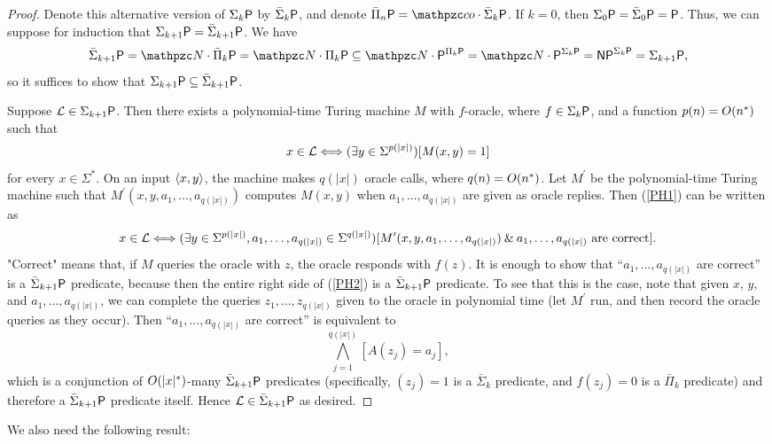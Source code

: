 \begin{proof}
Denote this alternative version of $\Sigma_k\mathsf{P}$ by $\bar\Sigma_k\mathsf{P}$, and 
denote $\bar\Pi_n\sP=\cco\cdot\bar\Sigma_k\sP$. If $k=0$, then 
$\Sigma_0\mathsf{P}=\bar\Sigma_0\mathsf{P}=\mathsf{P}$. Thus, we can suppose for induction that 
$\Sigma_{k+1}\mathsf{P}=\bar\Sigma_{k+1}\mathsf{P}$. We have
\[
\bar\Sigma_{k+1}\sP=\cN\cdot\bar\Pi_k\sP=\cN\cdot\Pi_k\sP\subseteq
\cN\cdot\sP^{\Pi_k\sP}=\cN\cdot\sP^{\Sigma_k\sP}=\NP^{\Sigma_k\sP}=
\Sigma_{k+1}\sP,
\]
so it suffices to show that $\Sigma_{k+1}\mathsf{P}\subseteq\bar\Sigma_{k+1}\mathsf{P}$.

Suppose $\mathcal{L}\in\Sigma_{k+1}\mathsf{P}$. Then there exists a polynomial-time Turing 
machine $M$ with $f$-oracle, where $f\in\Sigma_k\mathsf{P}$, and a function 
$p(n)=O(n^*)$ such that
\begin{equation}\label{PH1}
x\in\mathcal{L}\Longleftrightarrow
(\exists y\in\Sigma^{p(|x|)})[M(x,y)=1]
\end{equation}
for every $x\in\Sigma^*$. On an input $\left\langle x,y\right\rangle$, the machine makes $q(|x|)$ 
oracle calls, where $q(n)=O(n^*)$. Let $M^\prime$ be the polynomial-time Turing 
machine such that $M^\prime(x,y,a_1,\ldots,a_{q(|x|)})$ computes $M(x,y)$ when 
$a_1,\ldots,a_{q(|x|)}$ are given as oracle replies. Then (\ref{PH1}) can be 
written as 
\begin{equation}
x\in\mathcal{L}\Longleftrightarrow
(\exists y\in\Sigma^{p(|x|)},a_1,\ldots,a_{q(|x|)}\in\Sigma^{q(|x|)})
[M^\prime(x,y,a_1,\ldots,a_{q(|x|)})\mathbin{\&} a_1,\ldots,a_{q(|x|)}\text{ are 
correct}].
\end{equation}\label{PH2}
"Correct" means that, if $M$ queries the oracle with $z$, the oracle responds 
with $f(z)$. It is enough to show that ``$a_1,\ldots,a_{q(|x|)}$ are correct'' 
is a $\bar\Sigma_{k+1}\mathsf{P}$ predicate, because then the entire right side of 
(\ref{PH2}) is a $\bar\Sigma_{k+1}\mathsf{P}$ predicate. To see that this is the case, 
note that given $x$, $y$, and $a_1,\ldots,a_{q(|x|)}$, we can complete the 
queries $z_1,\ldots,z_{q(|x|)}$ given to the oracle in polynomial time (let 
$M^\prime$ run, and then record the oracle queries as they occur). Then 
``$a_1,\ldots,a_{q(|x|)}$ are correct'' is equivalent to
\[
\bigwedge_{j=1}^{q(|x|)}[A(z_j)=a_j],
\]
which is a conjunction of $O(|x|^*)$-many $\bar\Sigma_{k+1}\mathsf{P}$ predicates 
(specifically, $(z_j)=1$ is a $\bar\Sigma_k$ predicate, and $f(z_j)=0$ is a 
$\bar\Pi_k$ predicate) and therefore a $\bar\Sigma_{k+1}\mathsf{P}$ predicate itself. 
Hence $\mathcal{L}\in\bar\Sigma_{k+1}\mathsf{P}$ as desired.
\end{proof}
We also need the following result:
